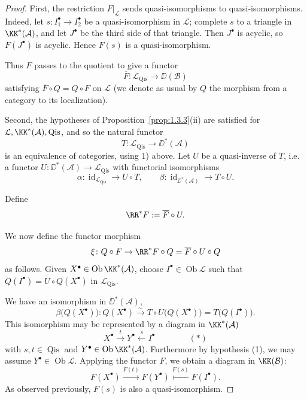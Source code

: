 \begin{proof}
First, the restriction $F|_{\mathcal{L}}$ sends quasi-isomorphisms to quasi-isomorphisms. Indeed, let $s\colon I_1^\bullet\to I_2^\bullet$ be a quasi-isomorphism in $\mathcal{L}$; complete $s$ to a triangle in $\KK^*(\mathcal{A})$, and let $J^\bullet$ be
the third side of that triangle. Then $J^\bullet$  is acyclic, so $F(J^\bullet)$ is acyclic. Hence $F(s)$ is a quasi-isomorphism.

Thus $F$ passes to the quotient to give a functor
\[
\overline{F}\colon\mathcal{L}_{\operatorname{Qis}} \to \DD(\mathcal{B})
\]
satisfying $\overline{F}\circ Q = Q\circ F$ on $\mathcal{L}$ (we denote as usual by $Q$
the morphism from a category to its localization).

Second, the hypotheses of Proposition~\ref{prop:1.3.3}(ii) are satisfied for $\mathcal{L},\KK^*(\mathcal{A}),\operatorname{Qis}$, and so the natural functor
\[
T\colon\mathcal{L}_{\operatorname{Qis}} \to \DD^*(\mathcal{A})
\]
is an equivalence of categories, using 1) above. Let $U$ be a quasi-inverse of $T$, i.e. a functor $U\colon\DD^*(\mathcal{A})\to\mathcal{L}_{\operatorname{Qis}}$ with functorial isomorphisms
\[
\alpha\colon \operatorname{id}_{\mathcal{L}_{\operatorname{Qis}}} \to U\circ T,\qquad
\beta\colon \operatorname{id}_{\DD^*(\mathcal{A})} \to T\circ U.
\]

Define
\[
\RR^*F := \overline{F}\circ U.
\]

We now define the functor morphism
\[
\xi\colon Q\circ F \to \RR^*F\circ Q = \overline{F}\circ U\circ Q
\]
as follows. Given $X^\bullet\in\operatorname{Ob}\KK^*(\mathcal{A})$, choose $I^\bullet\in\operatorname{Ob}\mathcal{L}$ such that $Q(I^\bullet)=U\circ Q(X^\bullet)$ in $\mathcal{L}_{\operatorname{Qis}}$.

We have an isomorphism in $\DD^*(\mathcal{A})$,
\[
\beta\big(Q(X^\bullet)\big)\colon Q(X^\bullet) \stackrel{\sim}{\longrightarrow}
T\circ U\big(Q(X^\bullet)\big) = T\big(Q(I^\bullet)\big).
\]
This isomorphism may be represented by a diagram in $\KK^*(\mathcal{A})$
\[
X^\bullet \xrightarrow{t} Y^\bullet \xleftarrow{s} I^\bullet
\quad \quad \quad \quad (*)\]
with $s,t\in\operatorname{Qis}$ and $Y^\bullet\in\operatorname{Ob}\KK^*(\mathcal{A})$. Furthermore by hypothesis (1), we may assume $Y^\bullet\in\operatorname{Ob}\mathcal{L}$. Applying the functor $F$, we obtain a diagram in $\KK(\mathcal{B})$:
\[
F(X^\bullet) \xrightarrow{F(t)} F(Y^\bullet)\xleftarrow{F(s)}  F(I^\bullet).
\]
As observed previously, $F(s)$ is also a quasi-isomorphism.


\end{proof}
